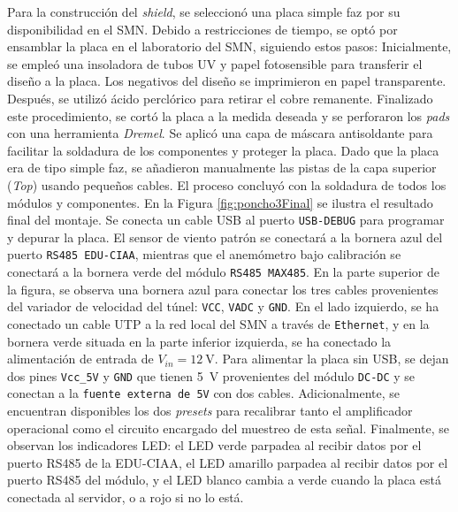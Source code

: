 Para la construcción del \textit{shield}, se seleccionó una placa simple faz por su disponibilidad en el SMN. Debido a restricciones de tiempo, se optó por ensamblar la placa en el laboratorio del SMN, siguiendo estos pasos: Inicialmente, se empleó una insoladora de tubos UV y papel fotosensible para transferir el diseño a la placa. Los negativos del diseño se imprimieron en papel transparente. Después, se utilizó ácido perclórico para retirar el cobre remanente. Finalizado este procedimiento, se cortó la placa a la medida deseada y se perforaron los \textit{pads} con una herramienta \textit{Dremel}. Se aplicó una capa de máscara antisoldante para facilitar la soldadura de los componentes y proteger la placa. Dado que la placa era de tipo simple faz, se añadieron manualmente las pistas de la capa superior (\textit{Top}) usando pequeños cables. El proceso concluyó con la soldadura de todos los módulos y componentes. En la Figura \ref{fig:poncho3Final} se ilustra el resultado final del montaje. Se conecta un cable USB al puerto \texttt{USB-DEBUG} para programar y depurar la placa. El sensor de viento patrón se conectará a la bornera azul del puerto \texttt{RS485 EDU-CIAA}, mientras que el anemómetro bajo calibración se conectará a la bornera verde del módulo \texttt{RS485 MAX485}. En la parte superior de la figura, se observa una bornera azul para conectar los tres cables provenientes del variador de velocidad del túnel: \texttt{VCC}, \texttt{VADC} y \texttt{GND}. En el lado izquierdo, se ha conectado un cable UTP a la red local del SMN a través de \texttt{Ethernet}, y en la bornera verde situada en la parte inferior izquierda, se ha conectado la alimentación de entrada de $V_{in} = \SI{12}{\volt}$. Para alimentar la placa sin USB, se dejan dos pines \texttt{Vcc\_5V} y \texttt{GND} que tienen \SI{5}{\volt} provenientes del módulo \texttt{DC-DC} y se conectan a la \texttt{fuente externa de 5V} con dos cables. Adicionalmente, se encuentran disponibles los dos \textit{presets} para recalibrar tanto el amplificador operacional como el circuito encargado del muestreo de esta señal. Finalmente, se observan los indicadores LED: el LED verde parpadea al recibir datos por el puerto RS485 de la EDU-CIAA, el LED amarillo parpadea al recibir datos por el puerto RS485 del módulo, y el LED blanco cambia a verde cuando la placa está conectada al servidor, o a rojo si no lo está.





